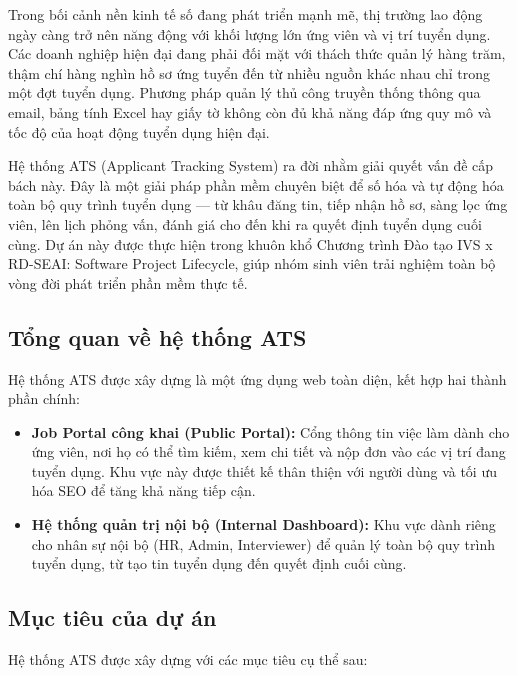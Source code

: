 Trong bối cảnh nền kinh tế số đang phát triển mạnh mẽ, thị trường lao động ngày càng trở nên năng động với khối lượng lớn ứng viên và vị trí tuyển dụng. Các doanh nghiệp hiện đại đang phải đối mặt với thách thức quản lý hàng trăm, thậm chí hàng nghìn hồ sơ ứng tuyển đến từ nhiều nguồn khác nhau chỉ trong một đợt tuyển dụng. Phương pháp quản lý thủ công truyền thống thông qua email, bảng tính Excel hay giấy tờ không còn đủ khả năng đáp ứng quy mô và tốc độ của hoạt động tuyển dụng hiện đại.

Hệ thống ATS (Applicant Tracking System) ra đời nhằm giải quyết vấn đề cấp bách này. Đây là một giải pháp phần mềm chuyên biệt để số hóa và tự động hóa toàn bộ quy trình tuyển dụng — từ khâu đăng tin, tiếp nhận hồ sơ, sàng lọc ứng viên, lên lịch phỏng vấn, đánh giá cho đến khi ra quyết định tuyển dụng cuối cùng. Dự án này được thực hiện trong khuôn khổ Chương trình Đào tạo IVS x RD-SEAI: Software Project Lifecycle, giúp nhóm sinh viên trải nghiệm toàn bộ vòng đời phát triển phần mềm thực tế.

\subsection{Tổng quan về hệ thống ATS}
Hệ thống ATS được xây dựng là một ứng dụng web toàn diện, kết hợp hai thành phần chính:

\begin{itemize}
    \item \textbf{Job Portal công khai (Public Portal):} Cổng thông tin việc làm dành cho ứng viên, nơi họ có thể tìm kiếm, xem chi tiết và nộp đơn vào các vị trí đang tuyển dụng. Khu vực này được thiết kế thân thiện với người dùng và tối ưu hóa SEO để tăng khả năng tiếp cận.
    \item \textbf{Hệ thống quản trị nội bộ (Internal Dashboard):} Khu vực dành riêng cho nhân sự nội bộ (HR, Admin, Interviewer) để quản lý toàn bộ quy trình tuyển dụng, từ tạo tin tuyển dụng đến quyết định cuối cùng.
\end{itemize}

\subsection{Mục tiêu của dự án}
Hệ thống ATS được xây dựng với các mục tiêu cụ thể sau:

